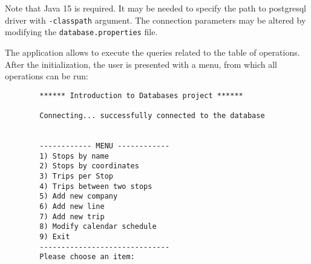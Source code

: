 	Note that Java 15 is required. It may be needed to specify the path to postgresql driver with \texttt{-classpath} argument. The connection parameters may be altered by modifying the \texttt{database.properties} file.

	The application allows to execute the queries related to the table of operations. After the initialization, the user is presented with a menu, from which all operations can be run:

	\begin{center}
		\centering
		\begin{lstlisting}
		****** Introduction to Databases project ******

		Connecting... successfully connected to the database


		------------ MENU ------------
		1) Stops by name
		2) Stops by coordinates
		3) Trips per Stop
		4) Trips between two stops
		5) Add new company
		6) Add new line
		7) Add new trip
		8) Modify calendar schedule
		9) Exit
		------------------------------
		Please choose an item:
		\end{lstlisting}
	\end{center}
